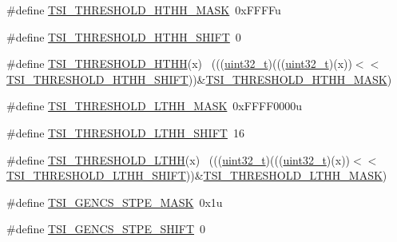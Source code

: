 \begin{DoxyCompactItemize}
\item 
\#define \hyperlink{group___t_s_i___register___masks_ga16649a111791f8e88bb8c6862f5c0e5e}{T\+S\+I\+\_\+\+T\+H\+R\+E\+S\+H\+O\+L\+D\+\_\+\+H\+T\+H\+H\+\_\+\+M\+A\+SK}~0x\+F\+F\+F\+Fu
\item 
\#define \hyperlink{group___t_s_i___register___masks_ga0ee9b07bb7ed9477302f8a0c7f822ef5}{T\+S\+I\+\_\+\+T\+H\+R\+E\+S\+H\+O\+L\+D\+\_\+\+H\+T\+H\+H\+\_\+\+S\+H\+I\+FT}~0
\item 
\#define \hyperlink{group___t_s_i___register___masks_gaeff11f0e851bc524a73e6600a8118e92}{T\+S\+I\+\_\+\+T\+H\+R\+E\+S\+H\+O\+L\+D\+\_\+\+H\+T\+HH}(x)                                    ~(((\hyperlink{_p_e___types_8h_a33594304e786b158f3fb30289278f5af}{uint32\+\_\+t})(((\hyperlink{_p_e___types_8h_a33594304e786b158f3fb30289278f5af}{uint32\+\_\+t})(x))$<$$<$\hyperlink{group___t_s_i___register___masks_ga0ee9b07bb7ed9477302f8a0c7f822ef5}{T\+S\+I\+\_\+\+T\+H\+R\+E\+S\+H\+O\+L\+D\+\_\+\+H\+T\+H\+H\+\_\+\+S\+H\+I\+FT}))\&\hyperlink{group___t_s_i___register___masks_ga16649a111791f8e88bb8c6862f5c0e5e}{T\+S\+I\+\_\+\+T\+H\+R\+E\+S\+H\+O\+L\+D\+\_\+\+H\+T\+H\+H\+\_\+\+M\+A\+SK})
\item 
\#define \hyperlink{group___t_s_i___register___masks_gafca3993e4d443bff9e8a948c8da493fb}{T\+S\+I\+\_\+\+T\+H\+R\+E\+S\+H\+O\+L\+D\+\_\+\+L\+T\+H\+H\+\_\+\+M\+A\+SK}~0x\+F\+F\+F\+F0000u
\item 
\#define \hyperlink{group___t_s_i___register___masks_gab010aabd2e3e83825b47d94614f49655}{T\+S\+I\+\_\+\+T\+H\+R\+E\+S\+H\+O\+L\+D\+\_\+\+L\+T\+H\+H\+\_\+\+S\+H\+I\+FT}~16
\item 
\#define \hyperlink{group___t_s_i___register___masks_ga5b68cec3fba7c3ff01a8f0f4d1986c43}{T\+S\+I\+\_\+\+T\+H\+R\+E\+S\+H\+O\+L\+D\+\_\+\+L\+T\+HH}(x)                                    ~(((\hyperlink{_p_e___types_8h_a33594304e786b158f3fb30289278f5af}{uint32\+\_\+t})(((\hyperlink{_p_e___types_8h_a33594304e786b158f3fb30289278f5af}{uint32\+\_\+t})(x))$<$$<$\hyperlink{group___t_s_i___register___masks_gab010aabd2e3e83825b47d94614f49655}{T\+S\+I\+\_\+\+T\+H\+R\+E\+S\+H\+O\+L\+D\+\_\+\+L\+T\+H\+H\+\_\+\+S\+H\+I\+FT}))\&\hyperlink{group___t_s_i___register___masks_gafca3993e4d443bff9e8a948c8da493fb}{T\+S\+I\+\_\+\+T\+H\+R\+E\+S\+H\+O\+L\+D\+\_\+\+L\+T\+H\+H\+\_\+\+M\+A\+SK})
\item 
\#define \hyperlink{group___t_s_i___register___masks_ga83a2e8e8965873c67507422e6e9a9b8e}{T\+S\+I\+\_\+\+G\+E\+N\+C\+S\+\_\+\+S\+T\+P\+E\+\_\+\+M\+A\+SK}~0x1u
\item 
\#define \hyperlink{group___t_s_i___register___masks_gab11b995ab664e22700a2f67aa2b1a070}{T\+S\+I\+\_\+\+G\+E\+N\+C\+S\+\_\+\+S\+T\+P\+E\+\_\+\+S\+H\+I\+FT}~0

\end{DoxyCompactItemize}
